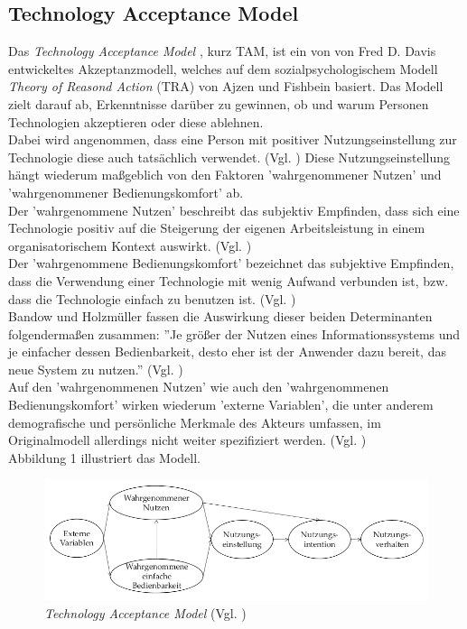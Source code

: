 \documentclass[deutsch]{lib/llncs/llncs}
\begin{document}
\subsection{Technology Acceptance Model}
Das \textit{Technology Acceptance Model} \cite{Zitat01}, kurz TAM, ist ein von von Fred D. Davis entwickeltes Akzeptanzmodell, welches auf dem sozialpsychologischem Modell \textit{Theory of Reasond Action} (TRA) von Ajzen und Fishbein \cite{Zitat04} basiert. Das Modell zielt darauf ab, Erkenntnisse darüber zu gewinnen, ob und warum Personen Technologien akzeptieren oder diese ablehnen. \\
Dabei wird angenommen, dass eine Person mit positiver Nutzungseinstellung zur Technologie diese auch tatsächlich verwendet. (Vgl. \cite[S. 237]{Zitat03}) Diese Nutzungseinstellung hängt wiederum maßgeblich von den Faktoren 'wahrgenommener Nutzen' und 'wahrgenommener Bedienungskomfort' ab. \\
Der 'wahrgenommene Nutzen' beschreibt das subjektiv Empfinden, dass sich eine Technologie positiv auf die Steigerung der eigenen Arbeitsleistung in einem organisatorischem Kontext auswirkt.  (Vgl. \cite[S. 320]{Zitat02}) \\
Der 'wahrgenommene Bedienungskomfort' bezeichnet das subjektive Empfinden, dass die Verwendung einer Technologie mit wenig Aufwand verbunden ist, bzw. dass die Technologie einfach zu benutzen ist. (Vgl. \cite[S. 320]{Zitat02}) \\
Bandow und Holzmüller fassen die Auswirkung dieser beiden Determinanten folgendermaßen zusammen: ''Je größer der Nutzen eines Informationssystems und je einfacher dessen Bedienbarkeit, desto eher ist der Anwender dazu bereit, das neue System zu nutzen.'' (Vgl. \cite[S. 237]{Zitat03}) \\
Auf den 'wahrgenommenen Nutzen' wie auch den 'wahrgenommenen Bedienungskomfort' wirken wiederum 'externe Variablen', die unter anderem demografische und persönliche Merkmale des Akteurs umfassen, im Originalmodell allerdings nicht weiter spezifiziert werden. (Vgl. \cite[S. 21]{Zitat01}) \\
Abbildung 1 illustriert das Modell.
\begin{figure}
	\centering
	\includegraphics[scale=0.40]{img/abbildung1.png}
	\caption{\textit{Technology Acceptance Model} (Vgl. \cite[S. 237]{Zitat03})}
\end{figure}
\end{document}
